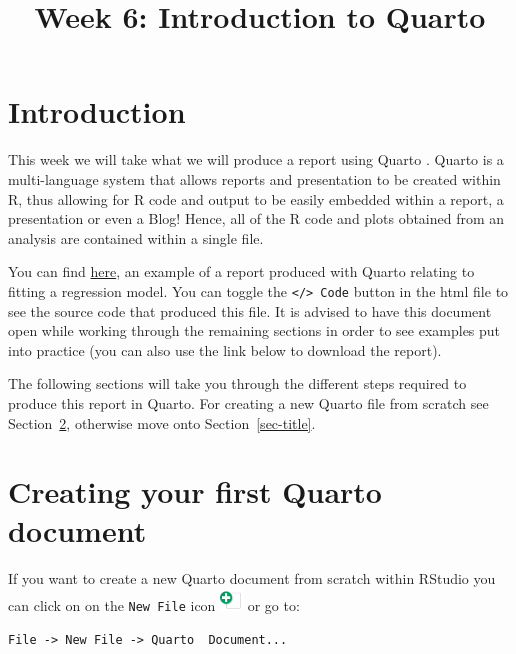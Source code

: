 \documentclass[
  letterpaper,
  DIV=11,
  numbers=noendperiod]{scrartcl}
\title{Week 6: Introduction to Quarto}
\author{}
\date{}
\makeatletter
\renewcommand{\maketitle}{\bgroup\setlength{\parindent}{0pt}
\begin{flushleft}
  {\color{uniblue}\sffamily\huge\textbf{\@title}} \vspace{0.3cm} \newline
  {\Large {\@subtitle}} \newline
  \@author
\end{flushleft}\egroup
}
\renewcommand*\contentsname{Table of contents}
\newcommand\contentsname{Table of contents}
\makeatother
\begin{document}
\maketitle

\pagestyle{mystyle}

\renewcommand*\contentsname{Contents}
{
\hypersetup{linkcolor=}
\setcounter{tocdepth}{3}
\tableofcontents
}
\section{Introduction}\label{introduction}

This week we will take what we will produce a report using Quarto .
Quarto is a multi-language system that allows reports and presentation
to be created within R, thus allowing for R code and output to be easily
embedded within a report, a presentation or even a Blog! Hence, all of
the R code and plots obtained from an analysis are contained within a
single file.

You can find
\href{https://moodle.gla.ac.uk/pluginfile.php/8299098/mod_resource/content/4/Example_report.htm}{here},
an example of a report produced with Quarto relating to fitting a
regression model. You can toggle the
\texttt{\textless{}/\textgreater{}\ Code} button in the html file to see
the source code that produced this file. It is advised to have this
document open while working through the remaining sections in order to
see examples put into practice (you can also use the link below to
download the report).

The following sections will take you through the different steps
required to produce this report in Quarto. For creating a new Quarto
file from scratch see Section~\ref{sec-quarto_init}, otherwise move onto
Section~\ref{sec-title}.

\section{Creating your first Quarto document}\label{sec-quarto_init}

If you want to create a new Quarto document from scratch within RStudio
you can click on on the \texttt{New\ File} icon
\includegraphics[width=0.23958in,height=\textheight]{images/new_doc.png}
or go to:

\texttt{File\ -\textgreater{}\ New\ File\ -\textgreater{}\ Quarto\ \ Document...}
\end{document}

